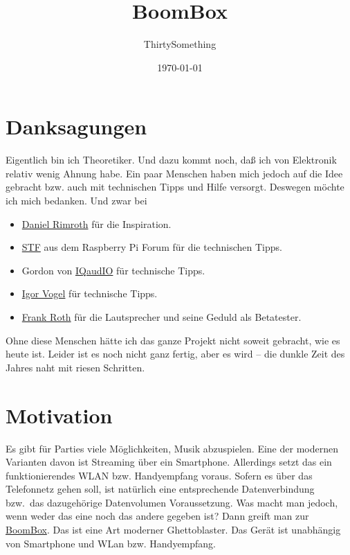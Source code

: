 \documentclass[12pt,a4paper]{article}
\author{ThirtySomething}
\title{BoomBox}
\date{\today}
\newcommand{\bb}{\href{https://github.com/ThirtySomething/BoomBox}{BoomBox}}
\begin{document}
\clearpage\maketitle
\thispagestyle{empty}
\newpage

\tableofcontents
{}
\newpage

\section{Danksagungen}

Eigentlich bin ich Theoretiker. Und dazu kommt noch, daß ich von Elektronik
relativ wenig Ahnung habe. Ein paar Menschen haben mich jedoch auf die Idee
gebracht bzw. auch mit technischen Tipps und Hilfe versorgt. Deswegen möchte
ich mich bedanken. Und zwar bei

\begin{itemize}
    \item \href{http://hellochili.de/}{Daniel Rimroth} für die Inspiration.
    \item \href{https://forum-raspberrypi.de/forum/thread/40895-ermittlung-strombedarf/?postID=354867&highlight=thirtysomething#post354867}{STF}
                aus dem Raspberry Pi Forum für die technischen Tipps.
    \item Gordon von \href{http://iqaudio.co.uk/}{IQaudIO} für technische Tipps.
    \item \href{https://www.xing.com/profile/Igor_Vogel2}{Igor Vogel} für technische Tipps.
    \item \href{http://roth-komplettservice.de/}{Frank Roth} für die Lautsprecher
                und seine Geduld als Betatester.
\end{itemize}

Ohne diese Menschen hätte ich das ganze Projekt nicht soweit gebracht, wie es
heute ist. Leider ist es noch nicht ganz fertig, aber es wird -- die dunkle
Zeit des Jahres naht mit riesen Schritten.

\section{Motivation}

Es gibt für Parties viele Möglichkeiten, Musik abzuspielen. Eine der modernen
Varianten davon ist Streaming über ein Smartphone. Allerdings setzt das ein
funktionierendes WLAN bzw. Handyempfang voraus. Sofern es über das Telefonnetz
gehen soll, ist natürlich eine entsprechende Datenverbindung bzw.~das
dazugehörige Datenvolumen Voraussetzung. Was macht man jedoch, wenn weder das
eine noch das andere gegeben ist? Dann greift man zur \bb{}. Das ist eine Art
moderner Ghettoblaster. Das Gerät ist unabhängig von Smartphone und WLan bzw.
Handyempfang.
\end{document}
